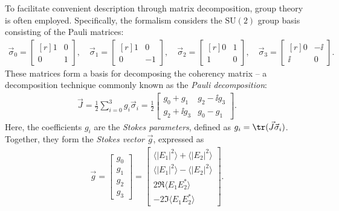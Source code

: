 To facilitate convenient description through matrix decomposition, group theory is often employed.
Specifically, the formalism considers the $\mathrm{SU}(2)$ group basis consisting of the Pauli matrices:
\begin{align}
    \label{eq:pauli-matrices}
    \vec\sigma_0 = \begin{bmatrix*}[r] 1 & 0 \\ 0 & 1 \end{bmatrix*}, \quad
    \vec\sigma_1 = \begin{bmatrix*}[r] 1 & 0 \\ 0 & -1 \end{bmatrix*}, \quad
    \vec\sigma_2 = \begin{bmatrix*}[r] 0 & 1 \\ 1 & 0 \end{bmatrix*}, \quad
    \vec\sigma_3 = \begin{bmatrix*}[r] 0 & -\ii \\ \ii & 0 \end{bmatrix*}.
\end{align}
These matrices form a basis for decomposing the coherency matrix -- a decomposition technique commonly known as the \emph{Pauli decomposition}:
\begin{align}
    \label{eq:pauli-decomposition}
    \vec J = \frac{1}{2} \sum_{i=0}^3 g_i \vec\sigma_i = \frac 12 \begin{bmatrix}
        g_0 + g_1 & g_2 - \ii g_3 \\
        g_2 + \ii g_3 & g_0 - g_1
    \end{bmatrix}.
\end{align}
Here, the coefficients $g_i$ are the \emph{Stokes parameters}, defined as $g_i = \tr(\vec J \vec\sigma_i)$.
Together, they form the \emph{Stokes vector} $\vec g$, expressed as
\begin{align}
    \label{eq:stokes-vector}
    \vec g = \begin{bmatrix} g_0 \\ g_1 \\ g_2 \\ g_3 \end{bmatrix} = \begin{bmatrix}
        \langle |E_1|^2 \rangle + \langle |E_2|^2 \rangle \\
        \langle |E_1|^2 \rangle - \langle |E_2|^2 \rangle \\
        2 \Re\langle E_1 E_2^* \rangle \\
        -2 \Im\langle E_1 E_2^* \rangle
    \end{bmatrix}.
\end{align}


